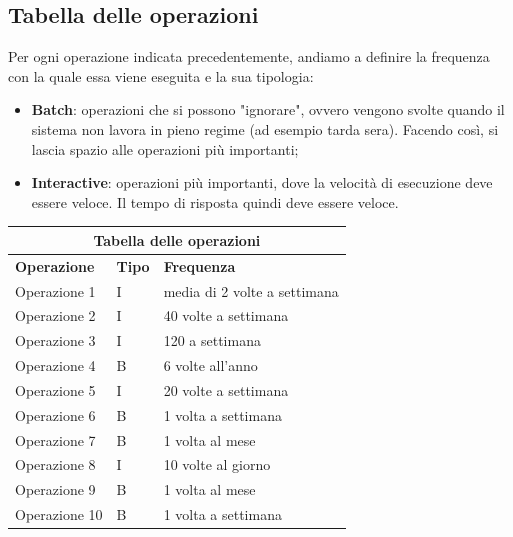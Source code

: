 \documentclass[legalpaper]{article}
\begin{document}
	\subsection{Tabella delle operazioni}
	Per ogni operazione indicata precedentemente, andiamo a definire la frequenza con la quale essa viene eseguita e la sua tipologia:
	\begin{itemize}
		\item \textbf{Batch}: operazioni che si possono "ignorare", ovvero vengono svolte quando il sistema non lavora in pieno regime (ad esempio tarda sera). Facendo così, si lascia spazio alle operazioni più importanti;
		\item \textbf{Interactive}: operazioni più importanti, dove la velocità di esecuzione deve essere veloce. Il tempo di risposta quindi deve essere veloce.
	\end{itemize}
		\renewcommand\arraystretch{2}
		\begin{tabular}{ |p{5cm}|p{2cm}|p{5cm}| }
			\hline
			\multicolumn{3}{|c|}{\textbf{Tabella delle operazioni}} \\
			\hline
			\textbf{Operazione} & \textbf{Tipo} & \textbf{Frequenza} \\
			\hline
			Operazione 1 & I &  media di 2 volte a settimana \\ \hline
			Operazione 2 & I & 40 volte a settimana \\ \hline
			Operazione 3 & I & 120 a settimana \\ \hline
			Operazione 4 & B & 6 volte all'anno \\ \hline
			Operazione 5 & I & 20 volte a settimana \\ \hline
			Operazione 6 & B & 1 volta a settimana \\ \hline
			Operazione 7 & B & 1 volta al mese \\ \hline
			Operazione 8 & I & 10 volte al giorno \\ \hline
			Operazione 9 & B & 1 volta al mese \\ \hline
			Operazione 10 & B & 1 volta a settimana \\ \hline
		
		\end{tabular}	
			
\end{document}
